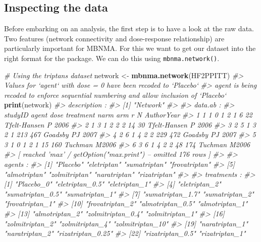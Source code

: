 \documentclass[]{article}
\newenvironment{Shaded}{\begin{snugshade}}{\end{snugshade}}
\newcommand{\CommentTok}[1]{\textcolor[rgb]{0.56,0.35,0.01}{\textit{#1}}}
\newcommand{\KeywordTok}[1]{\textcolor[rgb]{0.13,0.29,0.53}{\textbf{#1}}}
\newcommand{\NormalTok}[1]{#1}
\newcommand{\StringTok}[1]{\textcolor[rgb]{0.31,0.60,0.02}{#1}}
\begin{document}
\hypertarget{inspecting-the-data}{%
\subsection{Inspecting the data}\label{inspecting-the-data}}

Before embarking on an analysis, the first step is to have a look at the
raw data. Two features (network connectivity and dose-response
relationship) are particularly important for MBNMA. For this we want to
get our dataset into the right format for the package. We can do this
using \texttt{mbnma.network()}.

\begin{Shaded}
\begin{Highlighting}[]
\CommentTok{# Using the triptans dataset}
\NormalTok{network <-}\StringTok{ }\KeywordTok{mbnma.network}\NormalTok{(HF2PPITT)}
\CommentTok{#> Values for `agent` with dose = 0 have been recoded to `Placebo`}
\CommentTok{#> agent is being recoded to enforce sequential numbering and allow inclusion of `Placebo`}
\KeywordTok{print}\NormalTok{(network)}
\CommentTok{#> description :}
\CommentTok{#> [1] "Network"}
\CommentTok{#> }
\CommentTok{#> data.ab :}
\CommentTok{#>   studyID agent dose treatment narm arm   r   N          AuthorYear}
\CommentTok{#> 1       1     1    0         1    2   1   6  22 Tfelt-Hansen P 2006}
\CommentTok{#> 2       1     3    1         2    2   2  14  30 Tfelt-Hansen P 2006}
\CommentTok{#> 3       2     5    1         3    2   1 213 467     Goadsby PJ 2007}
\CommentTok{#> 4       2     6    1         4    2   2 229 472     Goadsby PJ 2007}
\CommentTok{#> 5       3     1    0         1    2   1  15 160       Tuchman M2006}
\CommentTok{#> 6       3     6    1         4    2   2  48 174       Tuchman M2006}
\CommentTok{#>  [ reached 'max' / getOption("max.print") -- omitted 176 rows ]}
\CommentTok{#> }
\CommentTok{#> agents :}
\CommentTok{#> [1] "Placebo"      "eletriptan"   "sumatriptan"  "frovatriptan"}
\CommentTok{#> [5] "almotriptan"  "zolmitriptan" "naratriptan"  "rizatriptan" }
\CommentTok{#> }
\CommentTok{#> treatments :}
\CommentTok{#>  [1] "Placebo_0"        "eletriptan_0.5"   "eletriptan_1"    }
\CommentTok{#>  [4] "eletriptan_2"     "sumatriptan_0.5"  "sumatriptan_1"   }
\CommentTok{#>  [7] "sumatriptan_1.7"  "sumatriptan_2"    "frovatriptan_1"  }
\CommentTok{#> [10] "frovatriptan_2"   "almotriptan_0.5"  "almotriptan_1"   }
\CommentTok{#> [13] "almotriptan_2"    "zolmitriptan_0.4" "zolmitriptan_1"  }
\CommentTok{#> [16] "zolmitriptan_2"   "zolmitriptan_4"   "zolmitriptan_10" }
\CommentTok{#> [19] "naratriptan_1"    "naratriptan_2"    "rizatriptan_0.25"}
\CommentTok{#> [22] "rizatriptan_0.5"  "rizatriptan_1"}
\end{Highlighting}
\end{Shaded}
\end{document}
